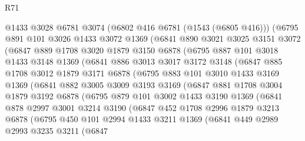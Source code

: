 \begin{lexlean}{R71}
\begin{coremodule}
      @1433
      @3028
      @6781
      @3074
      (@6802 @416 @6781 (@1543 (@6805 @416)))
      (@6795
        @891
        @101
        @3026
        @1433
        @3072
        @1369
        (@6841
          @890
          @3021
          @3025
          @3151
          @3072
          (@6847
            @889
            @1708
            @3020
            @1879
            @3150
            @6878
            (@6795
              @887
              @101
              @3018
              @1433
              @3148
              @1369
              (@6841
                @886
                @3013
                @3017
                @3172
                @3148
                (@6847
                  @885
                  @1708
                  @3012
                  @1879
                  @3171
                  @6878
                  (@6795
                    @883
                    @101
                    @3010
                    @1433
                    @3169
                    @1369
                    (@6841
                      @882
                      @3005
                      @3009
                      @3193
                      @3169
                      (@6847
                        @881
                        @1708
                        @3004
                        @1879
                        @3192
                        @6878
                        (@6795
                          @879
                          @101
                          @3002
                          @1433
                          @3190
                          @1369
                          (@6841
                            @878
                            @2997
                            @3001
                            @3214
                            @3190
                            (@6847
                              @452
                              @1708
                              @2996
                              @1879
                              @3213
                              @6878
                              (@6795
                                @450
                                @101
                                @2994
                                @1433
                                @3211
                                @1369
                                (@6841
                                  @449
                                  @2989
                                  @2993
                                  @3235
                                  @3211
                                  (@6847

\end{coremodule}
\end{lexlean}

